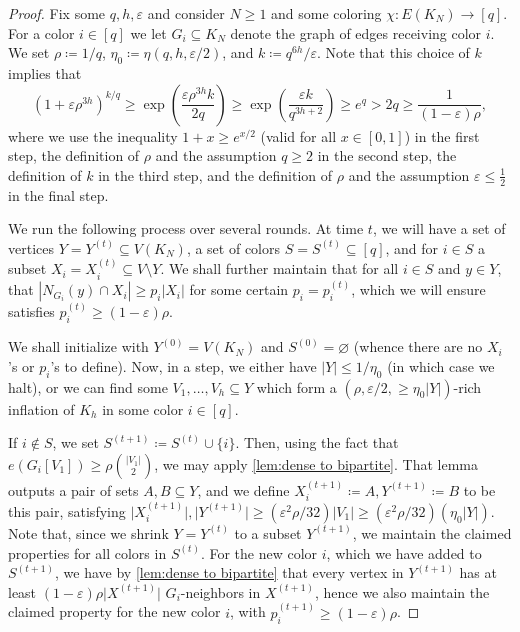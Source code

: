 \documentclass{aic}
\theoremstyle{plain}
\theoremstyle{remark}
\newcommand{\eps}{\ensuremath{\varepsilon}}
\let\emptyset\varnothing
\newcommand\ab[1]{\lvert #1 \rvert}
\newcommand\up[1]{^{(#1)}}
\begin{document}
\begin{proof}


Fix some $q,h,\eps$ and consider $N\ge 1$ and some coloring $\chi:E(K_N)\to [q]$. For a color $i\in [q]$ we let $G_i\subseteq K_N$ denote the graph of edges receiving color $i$. We set $\rho \coloneqq 1/q$, $\eta_0\coloneqq \eta(q,h,\eps/2)$, and $k\coloneqq q^{6h}/\eps$. Note that this choice of $k$ implies that
\begin{equation}\label{eq:k choice}
    (1+\eps \rho^{3h})^{k/q} \geq \exp \left( \frac{\eps \rho^{3h}k}{2q}\right) \geq \exp \left( \frac{\eps k}{q^{3h+2}}\right)\geq e^{q} > 2q \geq \frac{1}{(1-\eps)\rho},
\end{equation}
where we use the inequality $1+x \geq e^{x/2}$ (valid for all $x \in [0,1]$) in the first step, the definition of $\rho$ and the assumption $q \geq 2$ in the second step, the definition of $k$ in the third step, and the definition of $\rho$ and the assumption $\eps \leq \frac 12$ in the final step.

We run the following process over several rounds.
At time $t$, we will have a set of vertices $Y= Y^{(t)} \subseteq V(K_N)$, a set of colors $S= S^{(t)}\subseteq [q]$, and for $i\in S$ a subset $X_i= X^{(t)}_i\subseteq V\setminus Y$. We shall further maintain that for all $i\in S$ and $y\in Y$, that $|N_{G_i}(y)\cap X_i| \ge p_i|X_i|$ for some certain $p_i= p_i^{(t)}$, which we will ensure satisfies $p_i\up t\ge (1-\eps)\rho$. 


We shall initialize with $Y^{(0)} = V(K_N)$ and $S^{(0)} = \emptyset$ (whence there are no $X_i$'s or $p_i$'s to define). Now, in a step, we either have $|Y|\le 1/\eta_0$ (in which case we halt), or we can find some $V_1,\dots,V_{h}\subseteq Y$ which form a $(\rho,\eps/2,\ge \eta_0 |Y|)$-rich inflation of $K_h$ in some color $i\in [q]$. 

If $i \not \in S$, we set $S^{(t+1)} \coloneqq  S^{(t)}\cup \{i\}$. Then, using the fact that $e(G_i[V_1]) \geq \rho \binom{\ab{V_1}}2$, we may apply \cref{lem:dense to bipartite}. That lemma outputs a pair of sets $A,B \subseteq Y$, and we define $X_i \up{t+1}\coloneqq A, Y\up{t+1} \coloneqq B$ to be this pair, satisfying $\ab{X_i\up{t+1}}, \ab{Y\up{t+1}} \geq (\eps^2 \rho/32)\ab{V_1}\geq (\varepsilon^2\rho/32)(\eta_0\ab Y)$. Note that, since we shrink $Y= Y\up t$ to a subset $Y\up{t+1}$, we maintain the claimed properties for all colors in $S\up t$. For the new color $i$, which we have added to $S\up{t+1}$, we have by \cref{lem:dense to bipartite} that every vertex in $Y\up{t+1}$ has at least $(1-\eps)\rho \ab{X\up{t+1}}$ $G_i$-neighbors in $X\up{t+1}$, hence we also maintain the claimed property for the new color $i$, with $p_i\up {t+1} \geq (1-\eps)\rho$.




\end{proof}
\end{document}
